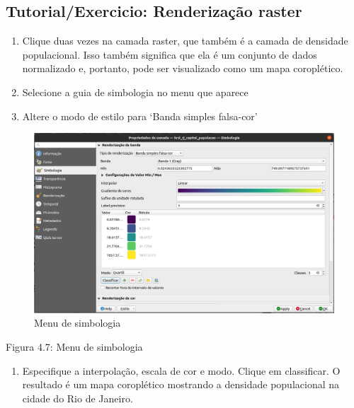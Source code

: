 \documentclass[
]{krantz}
\providecommand{\tightlist}{%
  \setlength{\itemsep}{0pt}\setlength{\parskip}{0pt}}
\begin{document}
\hypertarget{tutorialexercicio-renderizauxe7uxe3o-raster}{%
\subsection{Tutorial/Exercicio: Renderização raster}\label{tutorialexercicio-renderizauxe7uxe3o-raster}}

\begin{enumerate}
\def\labelenumi{\arabic{enumi}.}
\tightlist
\item
  Clique duas vezes na camada raster, que também é a camada de densidade populacional. Isso também significa que ela é um conjunto de dados normalizado e, portanto, pode ser visualizado como um mapa coroplético.
\item
  Selecione a guia de simbologia no menu que aparece
\item
  Altere o modo de estilo para `Banda simples falsa-cor'
\end{enumerate}

\begin{figure}
\centering
\includegraphics{media/modulo4/qgis9.png}
\caption{Menu de simbologia}
\end{figure}

Figura 4.7: Menu de simbologia

\begin{enumerate}
\def\labelenumi{\arabic{enumi}.}
\setcounter{enumi}{3}
\tightlist
\item
  Especifique a interpolação, escala de cor e modo. Clique em classificar. O resultado é um mapa coroplético mostrando a densidade populacional na cidade do Rio de Janeiro.
\end{enumerate}
\end{document}
